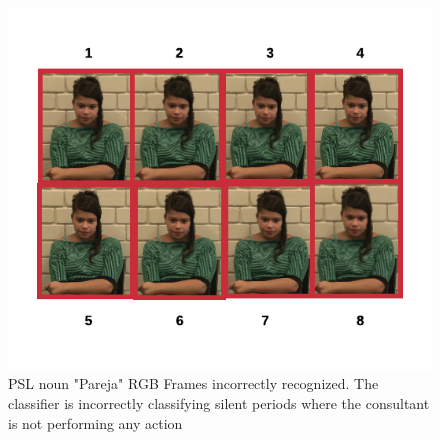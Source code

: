 \documentclass[twocolumn,conference]{article}
\begin{document}
\begin{figure}[hbt!]
\includegraphics[width=\linewidth]{images/pareja-rgb-frame-wrong.png}
\caption{PSL noun "Pareja" RGB Frames incorrectly recognized. The classifier is incorrectly classifying silent periods where the consultant is not performing any action}
\label{fig:rgb-pareja-wrong-sample}
\end{figure}
\end{document}
